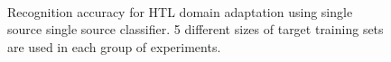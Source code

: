 \begin{figure}[th]
{}
\\
\caption{Recognition accuracy for HTL domain adaptation using single source single source classifier. 5 different sizes of target training sets are used in each group of experiments.}
\label{fig:exp}
\end{figure}

